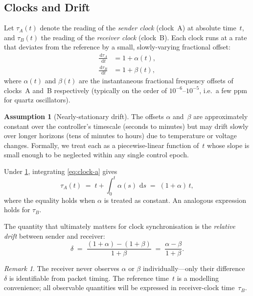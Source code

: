 \documentclass[11pt, a4paper]{article}
\theoremstyle{definition}
\newtheorem{assumption}{Assumption}[section]
\theoremstyle{plain}
\theoremstyle{remark}
\newtheorem{remark}{Remark}[section]
\newcommand{\dd}{\,\mathrm{d}}                   %
\begin{document}
\subsection{Clocks and Drift}\label{sec:clocks}

Let $\tau_A(t)$ denote the reading of the \emph{sender clock} (clock~A)
at absolute time~$t$, and $\tau_B(t)$ the reading of the
\emph{receiver clock} (clock~B).
Each clock runs at a rate that deviates from the reference by a small,
slowly-varying fractional offset:
\begin{align}
  \frac{\dd \tau_A}{\dd t} &= 1 + \alpha(t), \label{eq:clock-a} \\[4pt]
  \frac{\dd \tau_B}{\dd t} &= 1 + \beta(t),  \label{eq:clock-b}
\end{align}
where $\alpha(t)$ and $\beta(t)$ are the instantaneous fractional
frequency offsets of clocks~A and~B respectively (typically on the order
of $10^{-6}$--$10^{-5}$, i.e.\ a few ppm for quartz oscillators).

\begin{assumption}[Nearly-stationary drift]\label{as:drift}
  The offsets $\alpha$ and~$\beta$ are approximately constant over the
  controller's timescale (seconds to minutes) but may drift slowly over
  longer horizons (tens of minutes to hours) due to temperature or
  voltage changes.  Formally, we treat each as a piecewise-linear
  function of~$t$ whose slope is small enough to be neglected within any
  single control epoch.
\end{assumption}

Under \cref{as:drift}, integrating \eqref{eq:clock-a} gives
\begin{equation}\label{eq:tau-a}
  \tau_A(t) \;=\; t + \int_0^{t} \alpha(s)\,\dd s
            \;=\; (1 + \alpha)\,t,
\end{equation}
where the equality holds when $\alpha$ is treated as constant.
An analogous expression holds for $\tau_B$.

The quantity that ultimately matters for clock synchronisation is the
\emph{relative drift} between sender and receiver:
\begin{equation}\label{eq:rel-drift}
  \delta \;=\; \frac{(1+\alpha)-(1+\beta)}{1+\beta}
         \;=\; \frac{\alpha - \beta}{1+\beta}.
\end{equation}

\begin{remark}
  The receiver never observes $\alpha$ or $\beta$ individually---only
  their difference~$\delta$ is identifiable from packet timing.  The
  reference time~$t$ is a modelling convenience; all observable
  quantities will be expressed in receiver-clock time~$\tau_B$.
\end{remark}
\end{document}
